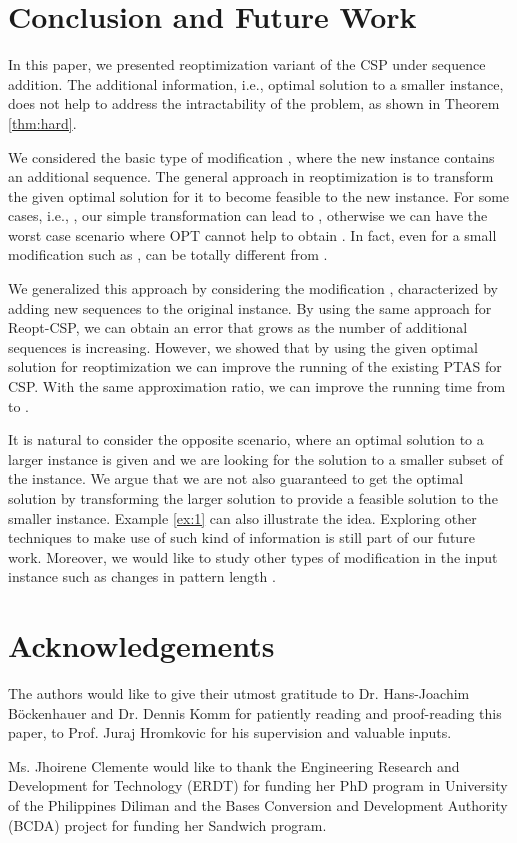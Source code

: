 \documentclass[journal]{acm_proc_article-sp}
\begin{document}
\section{Conclusion and Future Work}

In this paper, we presented reoptimization variant of the CSP under sequence addition. The additional information, i.e., optimal solution to a smaller instance, does not help to address the intractability of the problem, as shown in Theorem \ref{thm:hard}.

We considered the basic type of modification , where the new instance contains an additional sequence. The general approach in reoptimization is to transform the given optimal solution for it to become feasible to the new instance. For some cases, i.e., , our simple transformation can lead to , otherwise we can have the worst case scenario where OPT cannot help to obtain . In fact, even for a small modification such as ,   can be totally different from .

We generalized this approach by considering the modification , characterized by adding  new sequences to the original instance. By using the same approach for Reopt-CSP, we can obtain an error that grows  as the number of additional sequences is increasing. However, we showed that by using the given optimal  solution for reoptimization we can improve the running of the existing PTAS for CSP. With the same approximation ratio, we can improve the running time from  to . 

It is natural to consider the opposite scenario, where an optimal solution to a larger instance is given and we are looking for the solution to a smaller subset of the instance. We argue that we are not also guaranteed  to get the optimal solution by transforming the larger solution to provide a feasible solution to the smaller instance. Example \ref{ex:1} can also illustrate the idea. Exploring other techniques to make use of such kind of information is still part of our future work. Moreover, we would like to study other types of modification in the input instance such as changes in pattern length . 

\section{Acknowledgements}
The authors would like to give their utmost gratitude to Dr. Hans-Joachim B\"{o}ckenhauer and Dr. Dennis Komm for patiently reading and proof-reading this paper, to Prof. Juraj Hromkovic for his supervision and valuable inputs.

Ms. Jhoirene Clemente would like to thank the  Engineering Research and Development for Technology (ERDT) for funding her PhD program in University of the Philippines Diliman and the Bases Conversion and Development Authority (BCDA) project for funding her Sandwich program.



\end{document}
